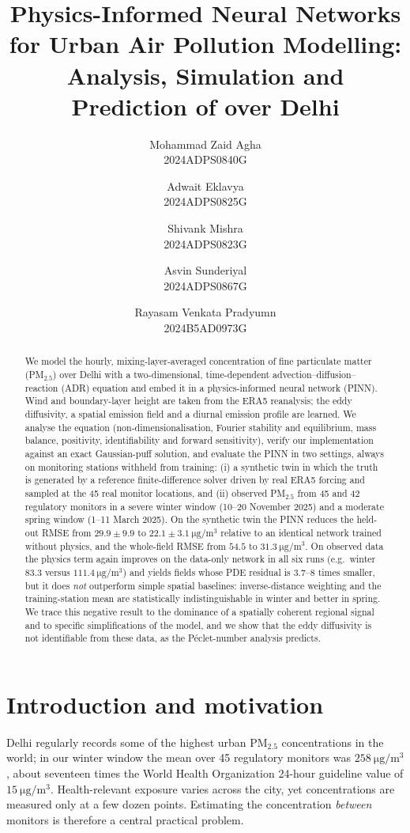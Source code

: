 \documentclass[11pt,a4paper]{article}
\title{Physics-Informed Neural Networks for Urban Air Pollution Modelling:\\
Analysis, Simulation and Prediction of \PMtwo{} over Delhi}
\author{
    Mohammad Zaid Agha \\ 2024ADPS0840G
    \and
    Adwait Eklavya \\ 2024ADPS0825G
    \and
    Shivank Mishra \\ 2024ADPS0823G
    \and
    Asvin Sunderiyal \\ 2024ADPS0867G
    \and
    Rayasam Venkata Pradyumn \\ 2024B5AD0973G
}
\date{}
\newcommand{\PMtwo}{PM$_{2.5}$}
\begin{document}
\maketitle

\begin{abstract}
We model the hourly, mixing-layer-averaged concentration of fine particulate matter (\PMtwo) over Delhi
with a two-dimensional, time-dependent advection--diffusion--reaction (ADR) equation and embed it in a
physics-informed neural network (PINN). Wind and boundary-layer height are taken from the ERA5
reanalysis; the eddy diffusivity, a spatial emission field and a diurnal emission profile are learned.
We analyse the equation (non-dimensionalisation, Fourier stability and equilibrium, mass balance,
positivity, identifiability and forward sensitivity), verify our implementation against an exact Gaussian-puff
solution, and evaluate the PINN in two settings, always on monitoring stations withheld from training:
(i) a synthetic twin in which the truth is generated by a reference finite-difference solver driven by
real ERA5 forcing and sampled at the 45 real monitor locations, and (ii) observed \PMtwo{} from 45 and 42
regulatory monitors in a severe winter window (10--20 November 2025) and a moderate spring window
(1--11 March 2025). On the synthetic twin the PINN reduces the held-out RMSE from
$29.9\pm9.9$ to $22.1\pm3.1~\si{\micro\gram\per\metre\cubed}$ relative to an identical network trained
without physics, and the whole-field RMSE from $54.5$ to $31.3~\si{\micro\gram\per\metre\cubed}$.
On observed data the physics term again improves on the data-only network in all six runs
(e.g.\ winter $83.3$ versus $111.4~\si{\micro\gram\per\metre\cubed}$) and yields fields whose PDE residual
is 3.7--8 times smaller, but it does \emph{not} outperform simple spatial baselines: inverse-distance
weighting and the training-station mean are statistically indistinguishable in winter and better in spring.
We trace this negative result to the dominance of a spatially coherent regional signal and to specific
simplifications of the model, and we show that the eddy diffusivity is not identifiable from these data,
as the P\'eclet-number analysis predicts.
\end{abstract}

\tableofcontents
\newpage

\section{Introduction and motivation}
Delhi regularly records some of the highest urban \PMtwo{} concentrations in the world; in our winter
window the mean over 45 regulatory monitors was $258~\si{\micro\gram\per\metre\cubed}$, about
seventeen times the World Health Organization 24-hour guideline value of
$15~\si{\micro\gram\per\metre\cubed}$. Health-relevant exposure varies across the city, yet concentrations are
measured only at a few dozen points. Estimating the concentration \emph{between} monitors is therefore a
central practical problem.
\end{document}
